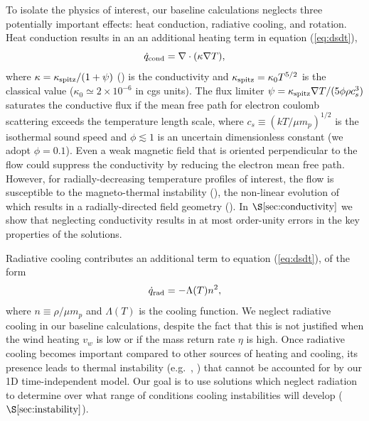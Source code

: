 \documentclass[usenatbib,fleqn]{mn2e}
\newcommand{\vwO}{v_{w}}
\begin{document}
To isolate the physics of interest, our baseline calculations
neglects three potentially important effects: heat conduction,
radiative cooling, and rotation.  Heat conduction results in
an an additional heating term in equation (\ref{eq:dsdt}),
\begin{equation}
\dot{q}_{\rm cond} = \nabla\cdot(\kappa \nabla T),
\label{eq:qdotcond}
 \end{equation}
 where $\kappa =\kappa_{\rm spitz}/(1+\psi)$
 (\citealt{DaltonBalbus:1993a}) is the conductivity and $\kappa_{\rm
   spitz} = \kappa_0 T^{5/2}$ is the classical \citet{Spitzer62} value
 ($\kappa_0\simeq 2\times 10^{-6}$ in cgs units).  The flux limiter
 $\psi = \kappa_{\rm spitz} \nabla T/(5\phi \rho c_s^3)$ saturates the
 conductive flux if the mean free path for electron coulomb scattering
 exceeds the temperature length scale, where $c_s \equiv (kT/\mu
 m_p)^{1/2}$ is the isothermal sound speed and $\phi \lesssim 1$ is an
 uncertain dimensionless constant (we adopt $\phi = 0.1$).  Even a
 weak magnetic field that is oriented perpendicular to the flow could
 suppress the conductivity by reducing the electron mean free
 path.  However, for radially-decreasing temperature profiles of
 interest, the flow is susceptible to the magneto-thermal instability
 (\citealt{Balbus01}), the non-linear evolution of which results in a radially-directed field geometry
 (\citealt{Parrish&Stone07}).  In $\S\ref{sec:conductivity}$ we show that neglecting conductivity results in at
 most order-unity errors in the key properties of the solutions.

Radiative cooling contributes an additional term to equation (\ref{eq:dsdt}), of the form
\begin{equation}
\dot{q}_{\rm rad} = -\Lambda(T)n^{2},
\label{eq:qdot_rad}
\end{equation}
where $n \equiv \rho/\mu m_p$ and $\Lambda(T)$ is
the cooling function.  We neglect radiative cooling in our baseline
calculations, despite the fact that this is not justified when the
wind heating $\vwO$ is low or if the mass return rate $\eta$ is high.
Once radiative cooling becomes important compared to other
sources of heating and cooling, its presence leads to thermal
instability (e.g.~\citealt{McCourt+12}, \citealt{Li&Bryan14a}) that cannot be accounted for
by our 1D time-independent model.  Our goal is to use solutions which neglect radiation to determine over what range of conditions cooling instabilities will develop
($\S\ref{sec:instability}$).
\end{document}
